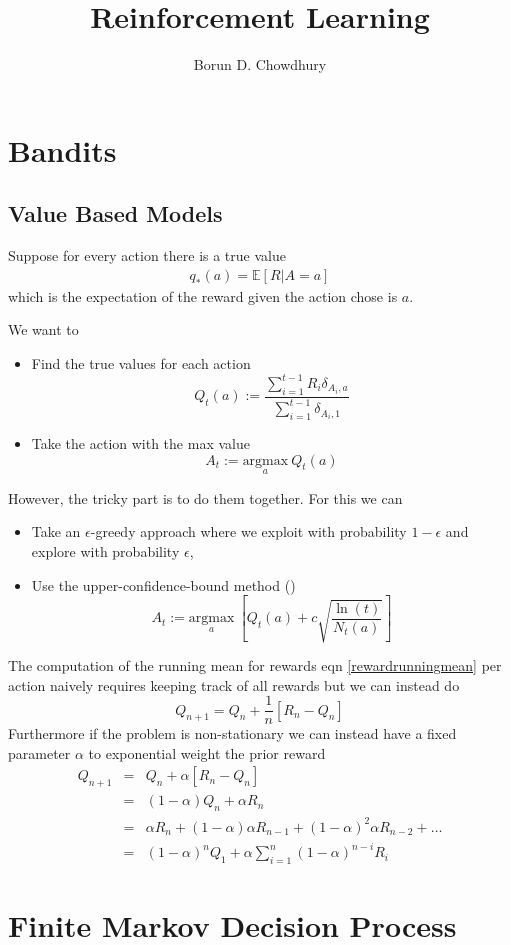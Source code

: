 \documentclass[11pt,a4paper]{article}
\title{Reinforcement Learning}
\author{Borun D. Chowdhury}
\newcommand\be{\begin{equation}}
\newcommand\bea{\begin{eqnarray}}
\newcommand\ee{\end{equation}}
\newcommand\eea{\end{eqnarray}}
\newcommand{\nn}{\nonumber \\}
\newcommand{\e}[1]{\mathbb E[#1]}
\newcommand{\todo}[1]{{\color{cyan}{TODO: #1}}}
\begin{document}
\maketitle

\section{Bandits}

\subsection{Value Based Models}

Suppose for every action there is a true value
\bea
q_*(a) = \e{R|A=a}
\eea
which is the expectation of the reward given the action chose is $a$.

We want to 
\begin{itemize}
\item Find the true values for each action
\be
Q_t(a) := \frac{\sum_{i=1}^{t-1} R_i \delta_{A_i,a}}{\sum_{i=1}^{t-1}  \delta_{A_i,1}} \label{rewardrunningmean}
\ee
\item Take the action with the max value
\be
A_t := \underset{a}{\text{argmax}} ~ Q_t(a)
\ee
\end{itemize}

However, the tricky part is to do them together. For this we can 
\begin{itemize}
\item Take an $\epsilon$-greedy approach where we exploit with probability $1-\epsilon$ and explore with probability $\epsilon$,
\item Use the upper-confidence-bound method (\todo{find the math behind this})
\be
A_t := \underset{a}{\text{argmax}} ~ \left[ Q_t(a) + c \sqrt{\frac{\ln(t)}{N_t(a)}}\right]
\ee
\end{itemize}

The computation of the running mean for rewards eqn \ref{rewardrunningmean} per action naively requires keeping track of all rewards but we can instead do
\be
Q_{n+1} = Q_n + \frac{1}{n} [R_n - Q_n]
\ee
Furthermore if the problem is non-stationary we can instead have a fixed parameter $\alpha$ to exponential weight the prior reward
\bea
Q_{n+1} &=& Q_n + \alpha [R_n - Q_n] \nn
&=& (1-\alpha) Q_n + \alpha R_n \nn
&=& \alpha R_n + (1-\alpha) \alpha R_{n-1} + (1-\alpha)^2 \alpha R_{n-2}  + \dots \nn
&=& (1-\alpha)^n Q_1 + \alpha \sum_{i=1}^n (1-\alpha)^{n-i} R_i
\eea

\section{Finite Markov Decision Process}
\end{document}
